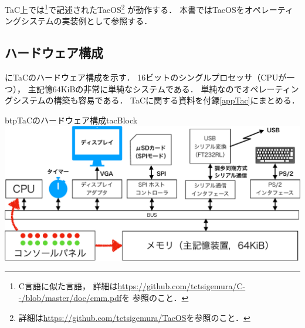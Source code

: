 TaC上では{\cmml}\footnote{
  C言語に似た言語，
  詳細は\url{https://github.com/tctsigemura/C--/blob/master/doc/cmm.pdf}を
  参照のこと．}で記述されたTacOS\footnote{
  詳細は\url{https://github.com/tctsigemura/TacOS}を参照のこと．} が動作する．
本書ではTacOSをオペレーティングシステムの実装例として参照する．

\subsection{ハードウェア構成}
にTaCのハードウェア構成を示す．
16ビットのシングルプロセッサ（CPUが一つ），
主記憶64KiBの非常に単純なシステムである．
単純なのでオペレーティングシステムの構築も容易である．
TaCに関する資料を付録\ref{appTac}にまとめる．

\begin{myfig}{btp}{TaCのハードウェア構成}{tacBlock}
  \includegraphics[scale=0.48]{Fig/tacBlock-crop.pdf}
\end{myfig}

